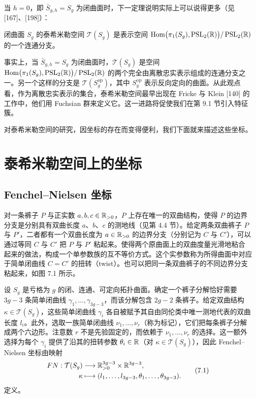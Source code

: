 当 $h=0$，即 $\bar S_{g,h}=S_g$ 为闭曲面时，下一定理说明实际上可以说得更多（见 [167]、[198]）：

\begin{theorem}[6.7] 闭曲面 $S_g$ 的泰希米勒空间 $\mathcal{T}(S_g)$ 是表示空间 $\operatorname{Hom}\bigl(\pi_1(S_g),\operatorname{PSL}_2(\mathbb{R})\bigr)/\operatorname{PSL}_2(\mathbb{R})$ 的一个连通分支。\end{theorem}

\begin{remark}[6.8] 事实上，当 $\bar S_{g,h}=S_g$ 为闭曲面时，$\mathcal{T}(S_g)$ 是空间 $\operatorname{Hom}\bigl(\pi_1(S_g),\operatorname{PSL}_2(\mathbb{R})\bigr)/\operatorname{PSL}_2(\mathbb{R})$ 的两个完全由离散忠实表示组成的连通分支之一。另一个这样的分支是 $\mathcal{T}(S_g^{\mathrm{op}})$，其中 $S_g^{\mathrm{op}}$ 表示反向定向的曲面。从此观点看，作为离散忠实表示的集合，泰希米勒空间最早出现在 Fricke 与 Klein [140] 的工作中，他们用 Fuchsian 群来定义它。这一进路将促使我们在第 9.1 节引入特征簇。\end{remark}

对泰希米勒空间的研究，因坐标的存在而变得便利，我们下面就来描述这些坐标。

\chapter{泰希米勒空间上的坐标}


\section{Fenchel–Nielsen 坐标}

对一条裤子 $P$ 与正实数 $a,b,c\in\mathbb{R}_{>0}$，$P$ 上存在唯一的双曲结构，使得 $P$ 的边界分支是分别具有双曲长度 $a$、$b$、$c$ 的测地线（见第 4.4 节）。给定两条双曲裤子 $P$ 与 $P'$，二者都有一个双曲长度为 $a\in\mathbb{R}_{>0}$ 的边界分支（分别记为 $C$ 与 $C'$），可以通过等同 $C$ 与 $C'$ 把 $P$ 与 $P'$ 粘起来。使得两个原曲面上的双曲度量光滑地粘合起来的做法，构成一个单参数族的互不等价方式。这个实参数称为所得曲面中对应于简单闭曲线 $C=C'$ 的扭转（twist）。也可以把同一条双曲裤子的不同边界分支粘起来，如图 7.1 所示。

设 $S_g$ 是亏格为 $g$ 的闭、连通、可定向拓扑曲面。确定一个裤子分解恰好需要 $3g-3$ 条简单闭曲线 $\gamma_1,\dots,\gamma_{3g-3}$，而该分解包含 $2g-2$ 条裤子。给定双曲结构 $\kappa\in\mathcal{T}(S_g)$，这些简单闭曲线 $\gamma_i$ 各自被赋予其自由同伦类中唯一测地代表的双曲长度 $l_i$。此外，选取一族简单闭曲线 $\nu_1,\dots,\nu_r$（称为标记），它们把每条裤子分解成两个六边形。注意数 $r$ 不是先验固定的，而依赖于 $\nu_1,\dots,\nu_r$ 的选择。这一额外选择为每个 $\gamma_i$ 提供了沿其的扭转参数 $\theta_i\in\mathbb{R}$（对 $\kappa\in\mathcal{T}(S_g)$），因此 Fenchel–Nielsen 坐标由映射
\begin{equation}
\begin{aligned}
FN:\mathcal{T}(S_g)&\longrightarrow \mathbb{R}^{3g-3}_{>0}\times\mathbb{R}^{3g-3},\\
\kappa&\longmapsto (l_1,\dots,l_{3g-3},\theta_1,\dots,\theta_{3g-3}).
\end{aligned}
\tag{7.1}
\end{equation}
定义。

